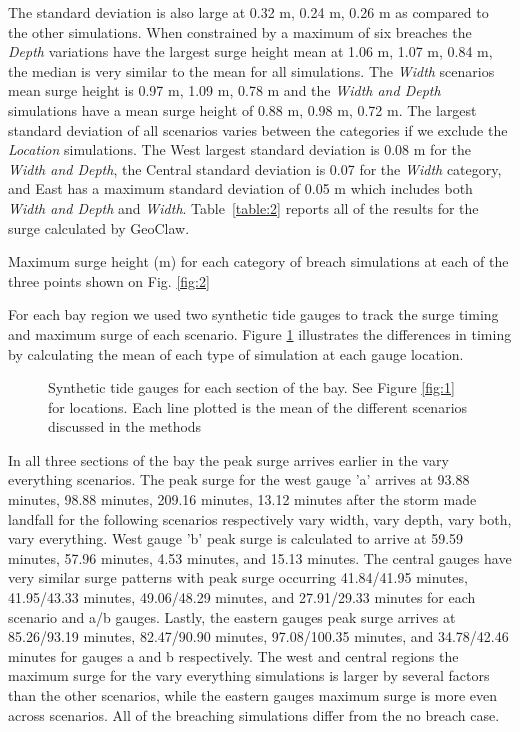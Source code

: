 \documentclass{coastal_paper}
\begin{document}
The standard deviation is also large at 0.32 m, 0.24 m, 0.26 m as compared to the other simulations. When constrained by a maximum of six breaches the \emph{Depth} variations have the largest surge height mean at 1.06 m, 1.07 m, 0.84 m, the median is very similar to the mean for all simulations. The \emph{Width} scenarios mean surge height is 0.97 m, 1.09 m, 0.78 m and the \emph{Width and Depth} simulations have a mean surge height of 0.88 m, 0.98 m, 0.72 m.
 The largest standard deviation of all scenarios varies between the categories if we exclude the \emph{Location} simulations. The West largest standard deviation is 0.08 m for the \emph{Width and Depth}, the Central standard deviation is 0.07 for the \emph{Width} category, and East has a maximum standard deviation of 0.05 m which includes both \emph{Width and Depth} and \emph{Width}. Table~\ref{table:2} reports all of the results for the surge calculated by GeoClaw.
 
\begin{table}[ht]
    \begin{adjustbox}{width=0.9\textwidth} %
    
    \end{adjustbox}
    \caption{Maximum surge height (m) for each category of breach simulations at each of the three points shown on Fig. \ref{fig:2}}
    \label{table:2}
\end{table}

For each bay region we used two synthetic tide gauges to track the surge timing and maximum surge of each scenario. Figure \ref{fig:4} illustrates the differences in timing by calculating the mean of each type of simulation at each gauge location.
\begin{figure}[ht]
    \centering
    \resizebox{\textwidth}{!}{%
            
        }
    \caption{Synthetic tide gauges for each section of the bay. See Figure \ref{fig:1} for locations. Each line plotted is the mean of the different scenarios discussed in the methods}
    \label{fig:4}
\end{figure}
In all three sections of the bay the peak surge arrives earlier in the vary everything scenarios. The peak surge for the west gauge 'a' arrives at  93.88 minutes, 98.88 minutes, 209.16 minutes, 13.12 minutes after the storm made landfall for the following scenarios respectively vary width, vary depth, vary both, vary everything. West gauge 'b' peak surge is calculated to arrive at 59.59 minutes, 57.96 minutes, 4.53 minutes, and 15.13 minutes. The central gauges have very similar surge patterns with peak surge occurring 41.84/41.95 minutes, 41.95/43.33 minutes, 49.06/48.29 minutes, and 27.91/29.33 minutes for each scenario and a/b gauges. Lastly, the eastern gauges peak surge arrives at 85.26/93.19 minutes, 82.47/90.90 minutes, 97.08/100.35 minutes, and 34.78/42.46 minutes for gauges a and b respectively. The west and central regions the maximum surge for the vary everything simulations is larger by several factors than the other scenarios, while the eastern gauges maximum surge is more even across scenarios. All of the breaching simulations differ from the no breach case.
\end{document}
